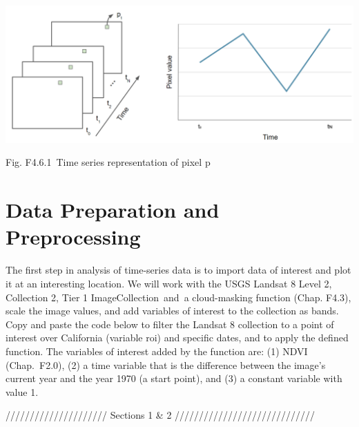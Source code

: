 \documentclass[
  letterpaper,
  DIV=11,
  numbers=noendperiod]{scrreprt}
\begin{document}
\includegraphics{./F4/image38.png}

Fig. F4.6.1~Time series representation of pixel p~

\hypertarget{data-preparation-and-preprocessing}{%
\section{Data Preparation and
Preprocessing}\label{data-preparation-and-preprocessing}}

The first step in analysis of time-series data is to import data of
interest and plot it at an interesting location. We will work with the
USGS Landsat 8 Level 2, Collection 2, Tier 1 ImageCollection~and~a
cloud-masking function (Chap. F4.3), scale the image values, and add
variables of interest to the collection as bands. Copy and paste the
code below to filter the Landsat 8 collection to a point of interest
over California (variable roi) and specific dates, and to apply the
defined function. The variables of interest added by the function are:
(1) NDVI (Chap.~F2.0), (2) a time variable that is the difference
between the image's current year and the year 1970 (a start point), and
(3) a constant variable with value 1.

///////////////////// Sections 1 \& 2 /////////////////////////////
\end{document}
